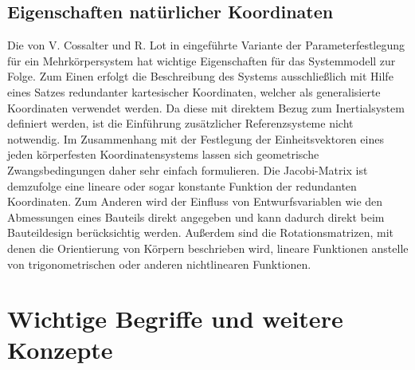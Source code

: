 \subsection{Eigenschaften nat\"urlicher Koordinaten}
  Die von V. Cossalter und R. Lot in \cite{Cossalter2002} eingef\"uhrte Variante der Parameterfestlegung f\"ur ein Mehrk\"orpersystem hat wichtige Eigenschaften f\"ur das Systemmodell zur Folge. \hfill \newline
  Zum Einen erfolgt die Beschreibung des Systems ausschlie\ss{}lich mit Hilfe eines Satzes redundanter kartesischer Koordinaten, welcher als generalisierte Koordinaten verwendet werden. Da diese mit direktem Bezug zum Inertialsystem definiert werden, ist die Einf\"uhrung zus\"atzlicher Referenzsysteme nicht notwendig. Im Zusammenhang mit der Festlegung der Einheitsvektoren eines jeden k\"orperfesten Koordinatensystems lassen sich geometrische Zwangsbedingungen daher sehr einfach formulieren. Die Jacobi-Matrix ist demzufolge eine lineare oder sogar konstante Funktion der redundanten Koordinaten. Zum Anderen wird der Einfluss von Entwurfsvariablen wie den Abmessungen eines Bauteils direkt angegeben und kann dadurch direkt beim Bauteildesign ber\"ucksichtig werden.  Au\ss{}erdem sind die Rotationsmatrizen, mit denen die Orientierung von K\"orpern beschrieben wird, lineare Funktionen anstelle von trigonometrischen oder anderen nichtlinearen Funktionen.  

\section{Wichtige Begriffe und weitere Konzepte}
